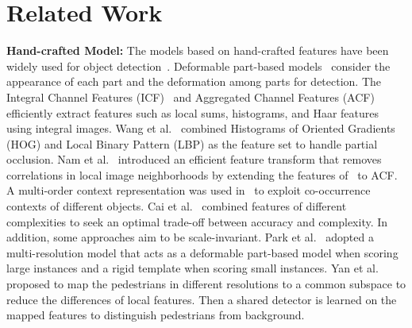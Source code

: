 \documentclass[journal]{IEEEtran}
\begin{document}
\section{Related Work}
\textbf{Hand-crafted Model:} The models based on hand-crafted features have been widely used for object detection~\cite{dalal2005histograms,viola2003detecting,wang2009hog,dollar2009integral,compact,dollar2014fast,zhang2014informed,felzenszwalb2010object,zheng2013strip,pang2014distributed,pang2016learning}. Deformable part-based models~\cite{felzenszwalb2010object} consider the appearance of each part and the deformation among parts for detection. The Integral Channel Features (ICF)~\cite{dollar2009integral} and Aggregated Channel Features (ACF)~\cite{dollar2014fast} efficiently extract features such as local sums, histograms, and Haar features using integral images. Wang et al.~\cite{wang2009hog} combined Histograms of Oriented Gradients (HOG) and Local Binary Pattern (LBP) as the feature set to handle partial occlusion. Nam et al.~\cite{nam2014local} introduced an efficient feature transform that removes correlations in local image neighborhoods by extending the features of~\cite{hariharan2012discriminative} to ACF. A multi-order context representation was used in~\cite{chen2013detection} to exploit co-occurrence contexts of different objects. Cai et al.~\cite{compact} combined features of different complexities to seek an optimal trade-off between accuracy and complexity. In addition, some approaches aim to be scale-invariant. Park et al.~\cite{park2010multiresolution} adopted a multi-resolution model that acts as a deformable part-based model when scoring large instances and a rigid template when scoring small instances. Yan et al.~\cite{yan2013robust} proposed to map the pedestrians in different resolutions to a common subspace to reduce the differences of local features. Then a shared detector is learned on the mapped features to distinguish pedestrians from background.
\end{document}
